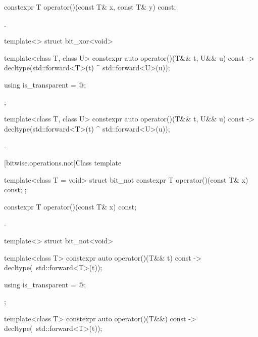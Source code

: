 %
\begin{itemdecl}
constexpr T operator()(const T& x, const T& y) const;
\end{itemdecl}

\begin{itemdescr}
\pnum
\returns
{}.
\end{itemdescr}

%
\begin{itemdecl}
template<> struct bit_xor<void> {
  template<class T, class U> constexpr auto operator()(T&& t, U&& u) const
    -> decltype(std::forward<T>(t) ^ std::forward<U>(u));

  using is_transparent = @\unspec@;
};
\end{itemdecl}

%
\begin{itemdecl}
template<class T, class U> constexpr auto operator()(T&& t, U&& u) const
    -> decltype(std::forward<T>(t) ^ std::forward<U>(u));
\end{itemdecl}

\begin{itemdescr}
\pnum
\returns
{}.
\end{itemdescr}

[bitwise.operations.not]{Class template }

\begin{itemdecl}
template<class T = void> struct bit_not {
  constexpr T operator()(const T& x) const;
};
\end{itemdecl}

%
\begin{itemdecl}
constexpr T operator()(const T& x) const;
\end{itemdecl}

\begin{itemdescr}
\pnum
\returns
{}.
\end{itemdescr}

%
\begin{itemdecl}
template<> struct bit_not<void> {
  template<class T> constexpr auto operator()(T&& t) const
    -> decltype(~std::forward<T>(t));

  using is_transparent = @\unspec@;
};
\end{itemdecl}

%
\begin{itemdecl}
template<class T> constexpr auto operator()(T&&) const
    -> decltype(~std::forward<T>(t));
\end{itemdecl}

